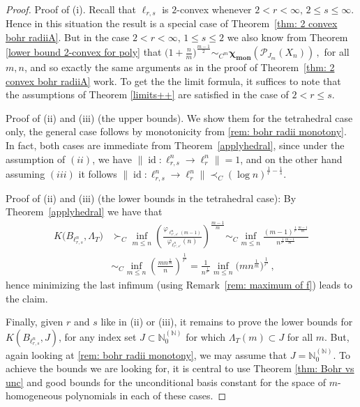 \documentclass[12pt]{amsart}
\numberwithin{subsection}{section}
\theoremstyle{definition}
\theoremstyle{remark}
\newcommand{\NN}{\mathbb N}
\DeclareMathOperator{\mon}{mon}
\DeclareMathOperator{\id}{\mathrm{id}}
\newcommand{\chimon}{\chi_{\mon}}
\newcommand{\Pp}{\mathcal{P}}
\begin{document}
\begin{proof}
Proof of (i). Recall that $\ell_{r,s}$  is $2$-convex whenever $2 < r < \infty, \,  2 \leq s \leq \infty$. Hence in this
situation the result is a special case of Theorem~\ref{thm: 2 convex bohr radiiA}. But in the case $2 < r < \infty,\, 1 \leq s \leq 2$
we also know from Theorem \ref{lower bound 2-convex for poly} that
$
\big( 1+\frac{n}{m}\big)^{\frac{m-1}{2}}\sim_{C^m}
\boldsymbol{\chimon}(\Pp_{J_m}( X_n)) \,,
$
for all  $m, n$, and so exactly the same arguments as in the proof of  Theorem~\ref{thm: 2 convex bohr radiiA} work.
To get the the limit formula, it suffices to note that the assumptions of Theorem \ref{limits++} are satisfied in the case of
$2< r \le s$.

\noindent
Proof of (ii) and (iii) (the upper bounds). We show them for the tetrahedral case only,  the general case follows by
monotonicity from \eqref{rem: bohr radii monotony}.  In fact, both  cases  are immediate from Theorem~\ref{applyhedral},
since under the assumption of $(ii)$, we have
$
\|\id\colon \ell_{r,s}^n \to \ell_r^n\| = 1$, and on the other hand assuming $(iii)$ it follows
$
\|\id\colon \ell_{r,s}^n \to \ell_r^n\| \prec_C (\log n)^{\frac{1}{r}-\frac{1}{s}}$.

\noindent Proof of (ii) and (iii) (the lower bounds in the tetrahedral case): By Theorem~\ref{applyhedral} we have that
\begin{align*}
K\big(B_{\ell_{r,s}^n},\Lambda_T\big)
& \succ_C \inf_{m\leq n}
\left(\frac{ \varphi_{\ell_{r',s'}^n(m-1)}}{\varphi_{\ell_{r',s'}^n}(n)} \right)^{\frac{m-1}{m}} \sim_C\inf_{m\leq n}
\frac{ (m-1)^{\frac{1}{r'}\frac{m-1}{m}}}{n^{\frac{1}{r'}\frac{m-1}{m}}}
\\
& \sim_C \inf_{m\leq n}
\left( \frac{m n^{\frac{1}{m}} }{n} \right) ^{\frac{1}{r'}} =\frac{1}{n^{\frac{1}{r'}}}\inf_{m\leq n}
\Big(m n^{\frac{1}{m}}\Big)^{\frac{1}{r'}}
\,,
\end{align*}
hence minimizing the last infimum (using Remark~\ref{rem: maximum of f}) leads to the  claim.

Finally, given $r$ and $s$ like in (ii) or (iii), it remains to prove the lower bounds for $ K(B_{\ell_{r,s}^n}, J)$, for any index set
$J\subset \NN_{0}^{(\NN)}$ for which  $\Lambda_{T}(m) \subset J$ for all $m$. But, again looking at  \eqref{rem: bohr radii monotony},
we may assume that  $J = \NN_0^{(\NN)}$. To achieve the bounds we are looking for, it is central to use Theorem \ref{thm: Bohr vs unc} and
good bounds for the unconditional basis constant for the space of $m$-homogeneous polynomials in each of these cases.


\end{proof}
\end{document}
